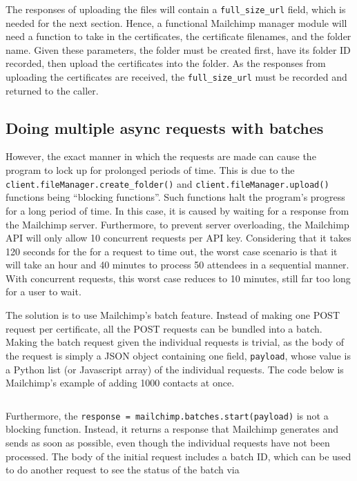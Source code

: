 \documentclass[11pt]{article}
\begin{document}
\inputminted[linenos=true]{python}{mailchimp_examples/upload_file.py}

\noindent
The responses of uploading the files will contain a \texttt{full\_size\_url} field, which is needed for the next section. Hence, a functional Mailchimp manager module will need a function to take in the certificates, the certificate filenames, and the folder name. Given these parameters, the folder must be created first, have its folder ID recorded, then upload the certificates into the folder. As the responses from uploading the certificates are received, the \texttt{full\_size\_url} must be recorded and returned to the caller.

\subsection{Doing multiple async requests with batches}

However, the exact manner in which the requests are made can cause the program to lock up for prolonged periods of time. This is due to the \texttt{client.fileManager.create_folder()} and \texttt{client.fileManager.upload()} functions being ``blocking functions''. Such functions halt the program's progress for a long period of time. In this case, it is caused by waiting for a response from the Mailchimp server. Furthermore, to prevent server overloading, the Mailchimp API will only allow 10 concurrent requests per API key. Considering that it takes 120 seconds for the for a request to time out, the worst case scenario is that it will take an hour and 40 minutes to process 50 attendees in a sequential manner. With concurrent requests, this worst case reduces to 10 minutes, still far too long for a user to wait.

The solution is to use Mailchimp's batch feature. Instead of making one POST request per certificate, all the POST requests can be bundled into a batch. Making the batch request given the individual requests is trivial, as the body of the request is simply a JSON object containing one field, \texttt{payload}, whose value is a Python list (or Javascript array) of the individual requests. The code below is Mailchimp's example of adding 1000 contacts at once.

\inputminted[linenos=true]{python}{mailchimp_examples/batch_request.py}

Furthermore, the \texttt{response = mailchimp.batches.start(payload)} is not a blocking function. Instead, it returns a response that Mailchimp generates and sends as soon as possible, even though the individual requests have not been processed. The body of the initial request includes a batch ID, which can be used to do another request to see the status of the batch via
\end{document}
